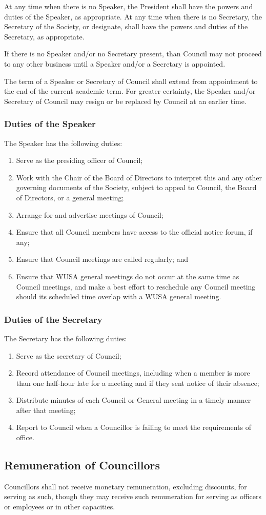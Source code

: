 At any time when there is no Speaker, the President shall have the powers and
duties of the Speaker, as appropriate.  At any time when there is no Secretary,
the Secretary of the Society, or designate, shall have the powers and duties of the
Secretary, as appropriate.

If there is no Speaker and/or no Secretary present, than Council may
not proceed to any other business until a Speaker and/or a Secretary is
appointed. 

The term of a Speaker or Secretary of Council shall extend from 
appointment to the end of the current academic term. For greater certainty,
the Speaker and/or Secretary of Council may resign or be replaced by
Council at an earlier time. 

\subsubsection{Duties of the Speaker}
The Speaker has the following duties:
\begin{enumerate}
  \item Serve as the presiding officer of Council;
  \item Work with the Chair of the Board of Directors to interpret this and any
      other governing documents of the Society, subject to appeal to 
      Council, the Board of Directors, or a general meeting;
  \item Arrange for and advertise meetings of Council;
  \item Ensure that all Council members have access to the official
      notice forum, if any;
  \item Ensure that Council meetings are called regularly; and
  \item Ensure that WUSA general meetings do not occur at the same time as Council meetings, and make a best effort to reschedule any Council meeting should its scheduled time overlap with a WUSA general meeting.
\end{enumerate}

\subsubsection{Duties of the Secretary}
The Secretary has the following duties:
\begin{enumerate}
  \item Serve as the secretary of Council;
  \item Record attendance of Council meetings, including when a
      member is more than one half-hour late for a meeting and if they sent
      notice of their absence;
  \item Distribute minutes of each Council or General meeting in a
      timely manner after that meeting;
  \item Report to Council when a Councillor is failing to meet the
      requirements of office.
\end{enumerate}

\subsection{Remuneration of Councillors}

Councillors shall not receive monetary remuneration, excluding discounts, 
for serving as such, though they may receive such remuneration for serving 
as officers or employees or in other capacities.

